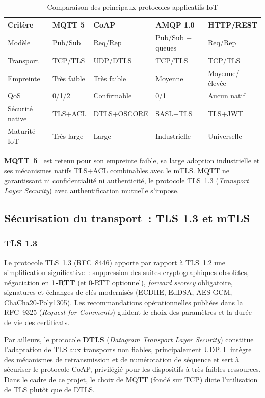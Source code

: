 \begin{table}[!htbp]
\centering
\caption{Comparaison des principaux protocoles applicatifs IoT}
\label{tab:protocoles}
\small
\begin{tabularx}{\linewidth}{|l|X|X|X|X|}
\hline
\textbf{Critère} & \textbf{MQTT 5} & \textbf{CoAP} & \textbf{AMQP 1.0} & \textbf{HTTP/REST} \\
\hline
Modèle & Pub/Sub & Req/Rep & Pub/Sub + queues & Req/Rep \\ \hline
Transport & TCP/TLS & UDP/DTLS & TCP/TLS & TCP/TLS \\ \hline
Empreinte & Très faible & Très faible & Moyenne & Moyenne/élevée \\ \hline
QoS & 0/1/2 & Confirmable & 0/1 & Aucun natif \\ \hline
Sécurité native & TLS+ACL & DTLS+OSCORE & SASL+TLS & TLS+JWT \\ \hline
Maturité IoT & Très large & Large & Industrielle & Universelle \\ \hline
\end{tabularx}
\end{table}

\textbf{MQTT~5}~\cite{mqtt5} est retenu pour son empreinte faible, sa large adoption industrielle et ses mécanismes natifs TLS+ACL combinables avec le mTLS. MQTT ne garantissant ni confidentialité ni authenticité, le protocole TLS~1.3 (\emph{Transport Layer Security}) avec authentification mutuelle s'impose.

\subsection{Sécurisation du transport~: TLS 1.3 et mTLS}
\label{sec:ea-tls}

\subsubsection{TLS 1.3}

Le protocole TLS~1.3 (RFC~8446) apporte par rapport à TLS~1.2 une simplification significative~: suppression des suites cryptographiques obsolètes, négociation en \textbf{1-RTT} (et 0-RTT optionnel), \emph{forward secrecy} obligatoire, signatures et échanges de clés modernisés (ECDHE, EdDSA, AES-GCM, ChaCha20-Poly1305). Les recommandations opérationnelles publiées dans la RFC~9325 (\emph{Request for Comments}) guident le choix des paramètres et la durée de vie des certificats.

Par ailleurs, le protocole \textbf{DTLS} (\emph{Datagram Transport Layer Security}) constitue l'adaptation de TLS aux transports non fiables, principalement UDP. Il intègre des mécanismes de retransmission et de numérotation de séquence et sert à sécuriser le protocole CoAP, privilégié pour les dispositifs à très faibles ressources. Dans le cadre de ce projet, le choix de MQTT (fondé sur TCP) dicte l'utilisation de TLS plutôt que de DTLS.

